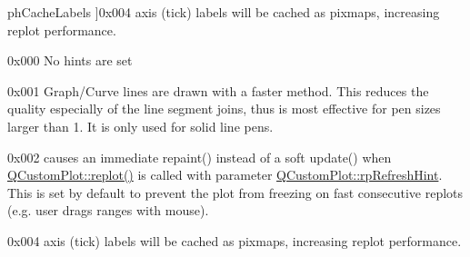 \begin{Desc}
\begin{description}
{ph\+Cache\+Labels\hypertarget{namespace_q_c_p_a5400e5fcb9528d92002ddb938c1f4ef4a3165c7c7d350a5a5813a4105067e2f37}{}\label{namespace_q_c_p_a5400e5fcb9528d92002ddb938c1f4ef4a3165c7c7d350a5a5813a4105067e2f37}
}]{\ttfamily 0x004} axis (tick) labels will be cached as pixmaps, increasing replot performance. \item[{\em 
ph\+None\hypertarget{namespace_q_c_p_a5400e5fcb9528d92002ddb938c1f4ef4a6a4b80cab7683c4533cb04b27a862fe1}{}\label{namespace_q_c_p_a5400e5fcb9528d92002ddb938c1f4ef4a6a4b80cab7683c4533cb04b27a862fe1}
}]{\ttfamily 0x000} No hints are set \item[{\em 
ph\+Fast\+Polylines\hypertarget{namespace_q_c_p_a5400e5fcb9528d92002ddb938c1f4ef4a016e00979e96542daa49cc14c976dd02}{}\label{namespace_q_c_p_a5400e5fcb9528d92002ddb938c1f4ef4a016e00979e96542daa49cc14c976dd02}
}]{\ttfamily 0x001} Graph/\+Curve lines are drawn with a faster method. This reduces the quality especially of the line segment joins, thus is most effective for pen sizes larger than 1. It is only used for solid line pens. \item[{\em 
ph\+Immediate\+Refresh\hypertarget{namespace_q_c_p_a5400e5fcb9528d92002ddb938c1f4ef4acf4738ba3f53c15dd1ad297f512b813e}{}\label{namespace_q_c_p_a5400e5fcb9528d92002ddb938c1f4ef4acf4738ba3f53c15dd1ad297f512b813e}
}]{\ttfamily 0x002} causes an immediate repaint() instead of a soft update() when \hyperlink{class_q_custom_plot_aa4bfe7d70dbe67e81d877819b75ab9af}{Q\+Custom\+Plot\+::replot()} is called with parameter \hyperlink{class_q_custom_plot_a45d61392d13042e712a956d27762aa39a5349b4ed6366760e34653bc54613a5ad}{Q\+Custom\+Plot\+::rp\+Refresh\+Hint}. This is set by default to prevent the plot from freezing on fast consecutive replots (e.\+g. user drags ranges with mouse). \item[{\em 
ph\+Cache\+Labels\hypertarget{namespace_q_c_p_a5400e5fcb9528d92002ddb938c1f4ef4a3165c7c7d350a5a5813a4105067e2f37}{}\label{namespace_q_c_p_a5400e5fcb9528d92002ddb938c1f4ef4a3165c7c7d350a5a5813a4105067e2f37}
}]{\ttfamily 0x004} axis (tick) labels will be cached as pixmaps, increasing replot performance. \end{description}
\end{Desc}
